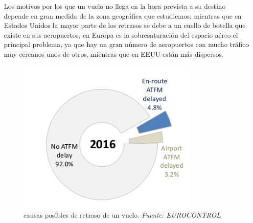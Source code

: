 Los motivos por los que un vuelo no llega en la hora prevista a su destino depende en gran medida de la zona geográfica que estudiemos: mientras que en Estados Unidos la mayor parte de los retrasos se debe a un cuello de botella que existe en sus aeropuertos, en Europa es la sobresaturación del espacio aéreo el principal problema, ya que hay un gran número de aeropuertos con mucho tráfico muy cercanos unos de otros, mientras que en EEUU están más dispersos.
\begin{figure}[h]
	\begin{center}
		\centering
		\includegraphics[width=0.8\textwidth]{./imagenes/introduccion/tiposRetrasos.png}
		\caption{causas posibles de retraso de un vuelo. \textit{Fuente: EUROCONTROL}}
		\label{fig: Causas posibles de retraso de un vuelo}
	\end{center}
\end{figure}

